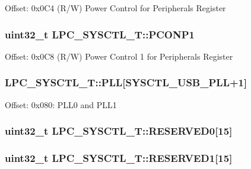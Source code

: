 Offset\-: 0x0\-C4 (R/\-W) Power Control for Peripherals Register \hypertarget{structLPC__SYSCTL__T_a7e1241849ab9c934991342896ba7c296}{
\subsubsection[{P\-C\-O\-N\-P1}]{ uint32\-\_\-t L\-P\-C\-\_\-\-S\-Y\-S\-C\-T\-L\-\_\-\-T\-::\-P\-C\-O\-N\-P1}}\label{structLPC__SYSCTL__T_a7e1241849ab9c934991342896ba7c296}
Offset\-: 0x0\-C8 (R/\-W) Power Control 1 for Peripherals Register \hypertarget{structLPC__SYSCTL__T_aabc2ad04761cf7c1cbfa8a43ddc91c84}{
\subsubsection[{P\-L\-L}]{ L\-P\-C\-\_\-\-S\-Y\-S\-C\-T\-L\-\_\-\-T\-::\-P\-L\-L\mbox{[}{\bf S\-Y\-S\-C\-T\-L\-\_\-\-U\-S\-B\-\_\-\-P\-L\-L}+1\mbox{]}}}\label{structLPC__SYSCTL__T_aabc2ad04761cf7c1cbfa8a43ddc91c84}
Offset\-: 0x080\-: P\-L\-L0 and P\-L\-L1 \hypertarget{structLPC__SYSCTL__T_aba8b07e1d5fe15516928f19d739f700e}{
\subsubsection[{R\-E\-S\-E\-R\-V\-E\-D0}]{\setlength{\rightskip}{0pt plus 5cm}uint32\-\_\-t L\-P\-C\-\_\-\-S\-Y\-S\-C\-T\-L\-\_\-\-T\-::\-R\-E\-S\-E\-R\-V\-E\-D0\mbox{[}15\mbox{]}}}\label{structLPC__SYSCTL__T_aba8b07e1d5fe15516928f19d739f700e}
\hypertarget{structLPC__SYSCTL__T_a794708954b13d73772d88570372b7e31}{
\subsubsection[{R\-E\-S\-E\-R\-V\-E\-D1}]{\setlength{\rightskip}{0pt plus 5cm}uint32\-\_\-t L\-P\-C\-\_\-\-S\-Y\-S\-C\-T\-L\-\_\-\-T\-::\-R\-E\-S\-E\-R\-V\-E\-D1\mbox{[}15\mbox{]}}}\label{structLPC__SYSCTL__T_a794708954b13d73772d88570372b7e31}
